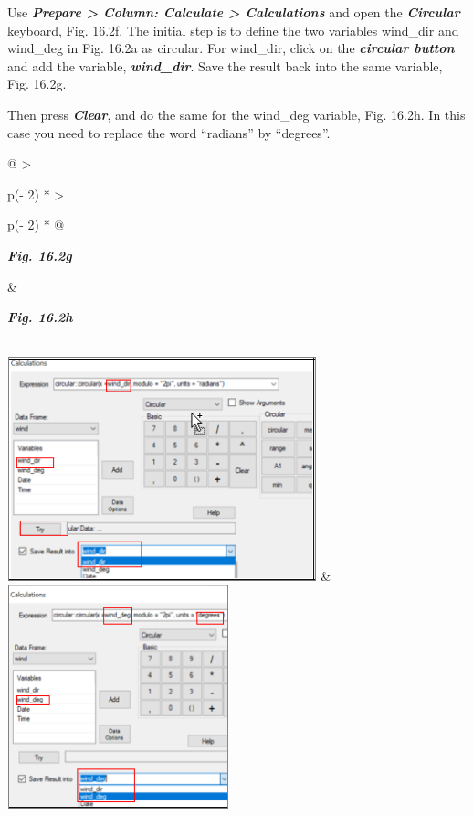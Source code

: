 \documentclass[
  letterpaper,
  DIV=11,
  numbers=noendperiod]{scrreprt}
\begin{document}
Use \textbf{\emph{Prepare \textgreater{} Column: Calculate
\textgreater{} Calculations}} and open the \textbf{\emph{Circular}}
keyboard, Fig. 16.2f. The initial step is to define the two variables
wind\_dir and wind\_deg in Fig. 16.2a as circular. For wind\_dir, click
on the \textbf{\emph{circular button}} and add the variable,
\textbf{\emph{wind\_dir}}. Save the result back into the same variable,
Fig. 16.2g.

Then press \textbf{\emph{Clear}}, and do the same for the wind\_deg
variable, Fig. 16.2h. In this case you need to replace the word
``radians'' by ``degrees''.

\begin{longtable}[]{@{}
  >{\raggedright\arraybackslash}p{(\columnwidth - 2\tabcolsep) * }
  >{\raggedright\arraybackslash}p{(\columnwidth - 2\tabcolsep) * }@{}}
\toprule\noalign{}
\begin{minipage}[b]{\linewidth}\raggedright
\textbf{\emph{Fig. 16.2g}}
\end{minipage} & \begin{minipage}[b]{\linewidth}\raggedright
\textbf{\emph{Fig. 16.2h}}
\end{minipage} \\
\midrule\noalign{}
\endhead
\bottomrule\noalign{}
\endlastfoot
\includegraphics[width=3.52704in,height=2.54731in]{figures/Fig16.2g.png}
&
\includegraphics[width=2.53673in,height=2.54967in]{figures/Fig16.2h.png} \\
\end{longtable}
\end{document}
